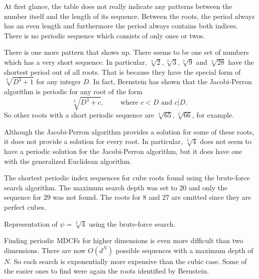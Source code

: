 At first glance, the table does not really indicate any patterns between the
number itself and the length of its sequence.
Between the roots, the period always has an even length
and furthermore the period always contains both indices.
There is no periodic sequence which consists of only ones or twos.

There is one more pattern that shows up.
There seems to be one set of numbers which has a very short sequence.
In particular, $\sqrt[3]{2}, \sqrt[3]{3}, \sqrt[3]{9}$ and $\sqrt[3]{28}$ have
the shortest period out of all roots.
That is because they have the special form of $\sqrt[3]{D^3 + 1}$ for any integer $D$.
In fact, Bernstein \cite{Bernstein71} has shown that the Jacobi-Perron
algorithm is periodic for any root of the form
\[
  \sqrt[3]{D^3 + c}, \qquad \text{ where } c < D \text{ and } c|D.
\]
So other roots with a short periodic sequence are $\sqrt[3]{65}, \sqrt[3]{66}$,
for example.

Although the Jacobi-Perron algorithm provides a solution for some of these
roots, it does not provide a solution for every root.
In particular, $\sqrt[3]{4}$ does not seem to have a periodic solution for the
Jacobi-Perron algorithm, but it does have one with the generalized Euclidean
algorithm.

\begin{table}[t]
  \caption{
    The shortest periodic index sequences for cube roots found using the
    brute-force search algorithm. The maximum search depth was set to $20$ and
    only the sequence for $29$ was not found. The roots for $8$ and $27$ are
    omitted since they are perfect cubes.}
  \label{tbl:cubics}
  \centering
  
\end{table}

\begin{table}[t]
  \caption{Representation of $ψ = \sqrt[3]{4}$ using the brute-force search.}
  \label{table:cube-root-4}
  \centering
  \footnotesize
  
\end{table}

Finding periodic MDCFs for higher dimensions is even more difficult than two dimensions.
There are now $O(d^N)$ possible sequences with a maximum depth of $N$.
So each search is exponentially more expensive than the cubic case.
Some of the easier ones to find were again the roots identified by Bernstein.


